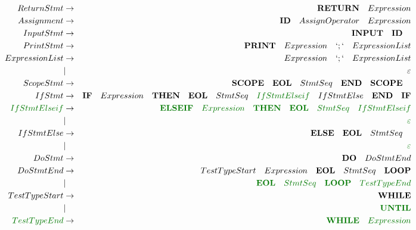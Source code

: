 \documentclass[a4paper,11pt,landscape,leqno]{article}
\begin{document}
\begin{eqnarray}
ReturnStmt	&	\rightarrow		& \textbf{RETURN}\quad Expression	  \\
Assignment	& \rightarrow		& \textbf{ID}\quad AssignOperator \quad Expression \\
InputStmt	&	 \rightarrow	& \textbf{INPUT}\quad \textbf{ID}\quad	 \\
PrintStmt	&	 \rightarrow	& \textbf{PRINT}\quad Expression\quad `;` \quad ExpressionList\\
ExpressionList&  \rightarrow	&  Expression\quad `;`\quad ExpressionList\\
			&	 |				& \varepsilon	\\
ScopeStmt	&	 \rightarrow	&	\textbf{SCOPE}\quad   \textbf{EOL} \quad StmtSeq\quad	 \textbf{END}\quad \textbf{SCOPE}\quad	  \\
IfStmt	&\rightarrow& \textbf{IF} \quad Expression \quad \textbf{THEN}\quad \textbf{EOL}\quad StmtSeq \quad \textcolor{green1}{IfStmtElseif}\quad IfStmtElse\quad \textbf{END}\quad \textbf{IF}	\\
\textcolor{green1}{IfStmtElseif}&\rightarrow &\textcolor{green1}{\textbf{ELSEIF}\quad Expression\quad \textbf{THEN}\quad \textbf{EOL}\quad StmtSeq \quad IfStmtElseif}	 \\
&	|	&\textcolor{green1}{\varepsilon}  \\
IfStmtElse&   \rightarrow &\textbf{ELSE}\quad  \textbf{EOL}\quad StmtSeq\quad  \\
&	|	&\textcolor{green1}{\varepsilon}  \\
DoStmt&    \rightarrow	  & \textbf{DO} \quad DoStmtEnd   \\
DoStmtEnd&	 \rightarrow  &  TestTypeStart \quad  Expression \quad \textbf{EOL} \quad StmtSeq \quad \textbf{LOOP}	\\
&	 | &\textcolor{green1}{\textbf{EOL} \quad StmtSeq \quad \textbf{LOOP}\quad TestTypeEnd} \\
TestTypeStart & \rightarrow	&	\textbf{WHILE}\\
		&		|		& \textcolor{green1}{\textbf{UNTIL}} \\
\textcolor{green1}{TestTypeEnd} & \rightarrow	&	\textcolor{green1}{\textbf{WHILE}\quad Expression} \\

\end{eqnarray}
\end{document}
